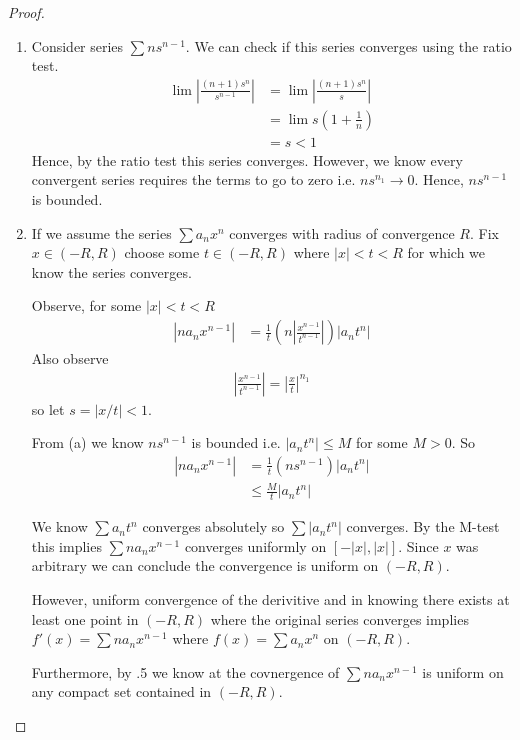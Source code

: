 \begin{proof}
    \begin{enumerate}[label=(\alph*)]
        \item 
        Consider series $\sum n s^{n-1}$. We can check if this series 
        converges using the ratio test.
        \begin{align*}
            \lim |\frac{(n+1)s^n}{s^{n-1}}| &= \lim |\frac{(n+1)s^n}{s}| \\
            &= \lim s(1+\frac{1}{n}) \\
            &= s < 1
        \end{align*}
        Hence, by the ratio test this series converges. However, we know 
        every convergent series requires the terms to go to zero i.e. $ns^{n_1}\rightarrow 0$.
        Hence, $ns^{n-1}$ is bounded.
    
        \item
        If we assume the series $\sum a_n x^n$ converges with radius of convergence 
        $R$. Fix $x\in (-R,R)$ choose some $t\in (-R,R)$ where $|x|<t<R$ for which 
        we know the series converges.

        Observe, for some $|x|<t<R$
        \begin{align*}
            |n a_n x^{n-1}| &= \frac{1}{t} (n |\frac{x^{n-1}}{t^{n-1}}|)|a_n t^n|
        \end{align*}
        Also observe 
        \begin{align*}
            |\frac{x^{n-1}}{t^{n-1}}| = |\frac{x}{t}|^{n_1}
        \end{align*}
        so let $s=|x/t|<1$.
        
        From (a) we know $ns^{n-1}$ is bounded i.e. $|a_n t^n| \leq M$
        for some $M>0$.
        So 
        \begin{align*}
            |n a_n x^{n-1}| &= \frac{1}{t} (n s^{n-1})|a_n t^n| \\
                        &\leq \frac{M}{t}  |a_n t^n|
        \end{align*}

        We know $\sum a_n t^n$ converges absolutely so $\sum |a_n t^n|$ converges. 
        By the M-test this implies $\sum n a_n x^{n-1}$ converges uniformly on
        $[-|x|,|x|]$. Since $x$ was arbitrary we can conclude the convergence is uniform on 
        $(-R,R)$. 

        However, uniform convergence of the derivitive and in knowing there exists at least 
        one point in $(-R,R)$ where the original series converges implies 
        $f'(x)=\sum n a_n x^{n-1}$ where $f(x) = \sum a_n x^n$ on $(-R,R)$.

        Furthermore, by .5 we know at the covnergence of $\sum n a_n x^{n-1}$ is uniform 
        on any compact set contained in $(-R,R)$.
    \end{enumerate}
\end{proof}

